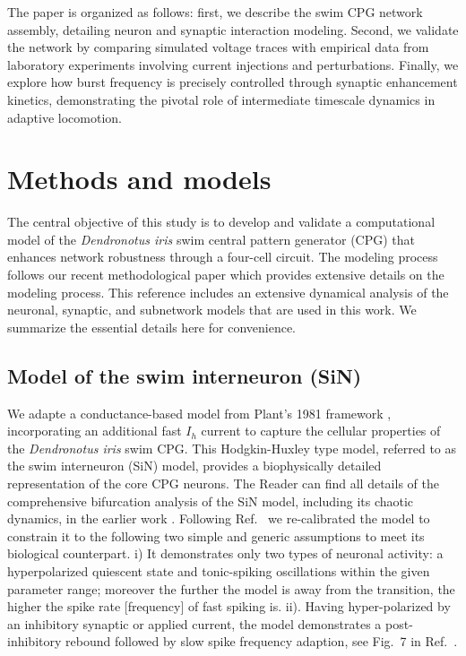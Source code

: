 \documentclass[nofootinbib,aip,amsmath,amssymb,reprint,twocolumn,10pt]{revtex4-2}
\begin{document}
The paper is organized as follows: first, we describe the swim CPG network assembly, detailing neuron and synaptic interaction modeling. Second, we validate the network by comparing simulated voltage traces with empirical data from laboratory experiments involving current injections and perturbations.
Finally, we explore how burst frequency is precisely controlled through synaptic enhancement kinetics, demonstrating the pivotal role of intermediate timescale dynamics in adaptive locomotion.

\section{Methods and models}
%
The central objective of this study is to develop and validate a computational model of the \textit{Dendronotus iris} swim central pattern generator (CPG) that enhances network robustness through a four-cell circuit.
The modeling process follows our recent methodological paper \cite{scully2024pairing} which provides extensive details on the modeling process.
This reference includes an extensive dynamical analysis of the neuronal, synaptic, and subnetwork models that are used in this work. We summarize the essential details here for convenience.

\subsection{Model of the swim interneuron (SiN)}
%
We adapte a conductance-based model from Plant's 1981 framework \cite{plant81, scully2024pairing}, incorporating an additional fast $I_h$ current to capture the cellular properties of the \textit{Dendronotus iris} swim CPG. This Hodgkin-Huxley type model, referred to as the swim interneuron (SiN) model, provides a biophysically detailed representation of the core CPG neurons. The Reader can find all details of the  comprehensive bifurcation analysis of the SiN model, including its chaotic dynamics, in the earlier work \cite{scully2024chaos}. Following Ref.~\cite{scully2024chaos} we re-calibrated the model to constrain it to the following two simple and generic assumptions to meet its biological counterpart.  i) It demonstrates only two types of neuronal activity: a hyperpolarized quiescent state and tonic-spiking oscillations within the given parameter range; moreover the further the model is away from the transition, the higher the spike rate [frequency] of fast spiking is. ii). Having hyper-polarized by an inhibitory synaptic or applied current, the model demonstrates a post-inhibitory rebound followed by slow spike frequency adaption, see Fig.~7 in Ref.~\cite{scully2024pairing}.      
\end{document}
